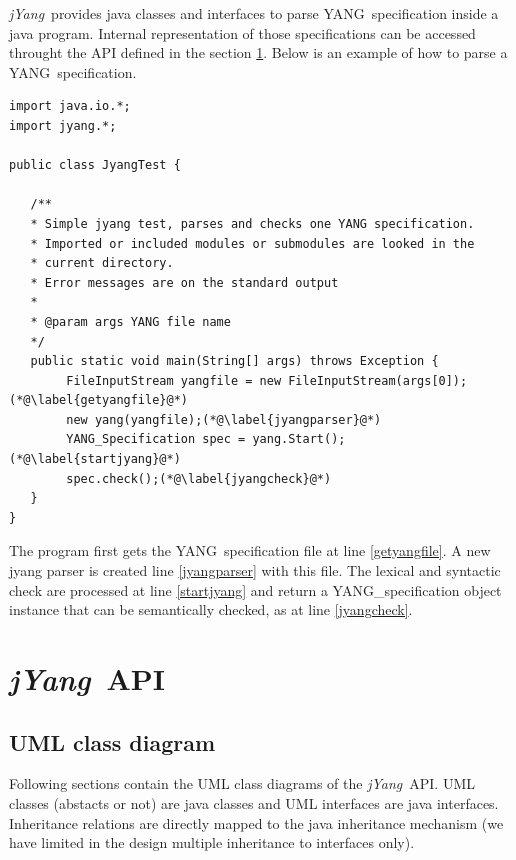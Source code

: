 \documentclass[a4paper]{article}
\newcommand{\jyang}{{\sl jYang}}
\newcommand{\y}{YANG}
\begin{document}
\jyang\   provides  java   classes   and  interfaces   to  parse   \y\
specification inside a java  program. Internal representation of those
specifications can be accessed throught the API defined in the section
\ref{api}. Below is an example of how to parse a \y\ specification.

\begin{lstlisting}
import java.io.*;
import jyang.*;

public class JyangTest {

   /**
   * Simple jyang test, parses and checks one YANG specification.
   * Imported or included modules or submodules are looked in the 
   * current directory.
   * Error messages are on the standard output
   * 
   * @param args YANG file name
   */
   public static void main(String[] args) throws Exception {
        FileInputStream yangfile = new FileInputStream(args[0]);(*@\label{getyangfile}@*)
        new yang(yangfile);(*@\label{jyangparser}@*)
        YANG_Specification spec = yang.Start();(*@\label{startjyang}@*)
        spec.check();(*@\label{jyangcheck}@*)
   }
}
\end{lstlisting}

The   program  first  gets   the  \y\   specification  file   at  line
\ref{getyangfile}.    A    new   jyang   parser    is   created   line
\ref{jyangparser} with this file.  The lexical and syntactic check are
processed  at line  \ref{startjyang} and  return  a YANG\_specification
object  instance  that  can   be  semantically  checked,  as  at  line
\ref{jyangcheck}.

\section{\jyang\ API}
\label{api}

\subsection{UML class diagram}

Following  sections contain  the  UML class  diagrams  of the  \jyang\
API. UML classes (abstacts or not) are java classes and UML interfaces
are java interfaces.  Inheritance relations are directly mapped to the
java  inheritance mechanism (we  have limited  in the  design multiple
inheritance to interfaces only).
\end{document}
